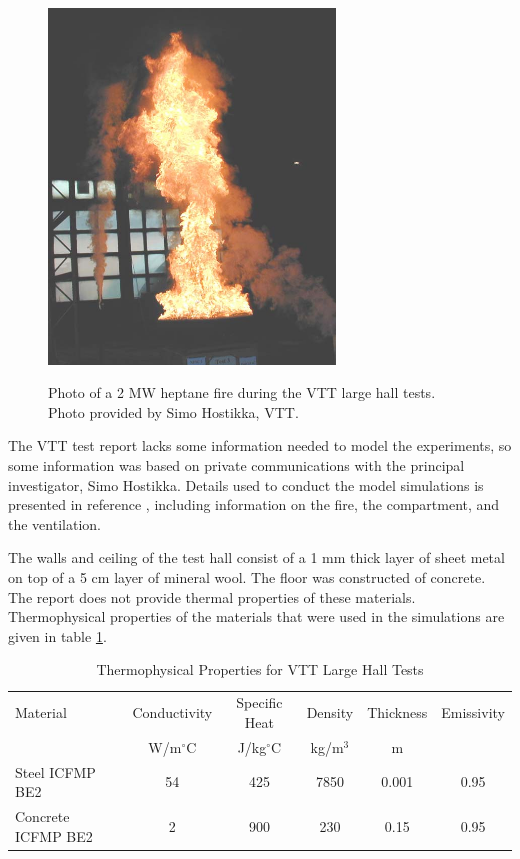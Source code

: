 \begin{figure}[\figoptions{b}]
\begin{center}
\includegraphics[width=3.0in]{FIGURES/VTT/VTT_2MW_fire}\\
\end{center}
\caption{Photo of a 2 MW heptane fire during the VTT large hall tests. Photo provided by Simo Hostikka, VTT.}
 \label{fig:VTT_2MW_fire}
\end{figure}

The VTT test report lacks some information needed to model the experiments, so some information was based on private communications with the principal investigator, Simo Hostikka. Details used to conduct the model simulations is presented in reference \cite{NRCNUREG1824}, including information on the fire, the compartment, and the ventilation.

The walls and ceiling of the test hall consist of a 1 mm thick layer of sheet metal on top of a 5 cm layer of mineral wool. The floor was constructed of concrete. The report does not provide thermal properties of these materials. Thermophysical properties of the materials that were used in the simulations are given in table \ref{tab:VTT_Thermals}.

\begin{table}[h!]
\begin{center}
\caption{Thermophysical Properties for VTT Large Hall Tests}
\label{tab:VTT_Thermals}
\vspace{0.1in}
\begin{tabular}{|l|c|c|c|c|c|}
\hline
Material & Conductivity & Specific Heat & Density & Thickness & Emissivity\\
 & W/m$^{\circ}$C & J/kg$^{\circ}$C & kg/m$^3$ & m & \\ \hline
\hline
Steel ICFMP BE2 & 54 &        425 &       7850 &      0.001 &       0.95  \\ \hline
Concrete ICFMP BE2 &          2 &        900 &        230 &       0.15 &       0.95 \\ \hline
\end{tabular}
\end{center}
\end{table}


